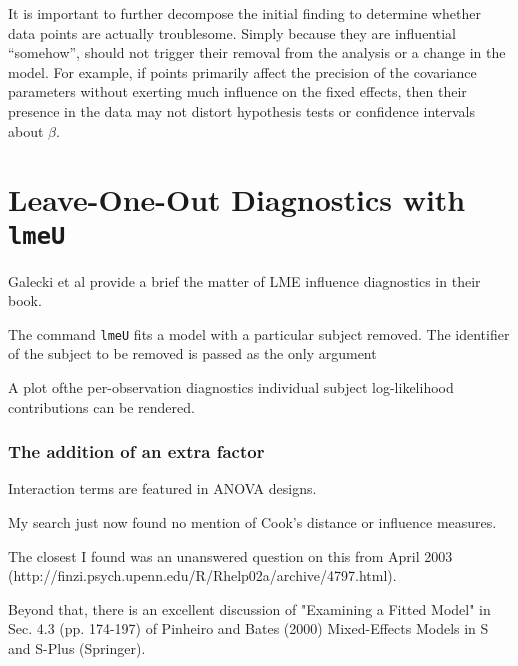 \documentclass[12pt, a4paper]{report}
\theoremstyle{plain}
\theoremstyle{definition}
\theoremstyle{remark}
\begin{document}
It is important to further decompose the initial finding to determine whether data points are actually troublesome.
Simply because they are influential “somehow”, should not trigger their removal from the analysis or
a change in the model. For example, if points primarily affect the precision of the covariance parameters
without exerting much influence on the fixed effects, then their presence in the data may not distort hypothesis
tests or confidence intervals about $\beta$.


\section*{Leave-One-Out Diagnostics with \texttt{lmeU}}
Galecki et al provide a brief the matter of LME influence diagnostics in their book.

The command \texttt{lmeU} fits a model with a particular subject removed. The identifier of the subject to be removed is passed as the only argument

A plot ofthe per-observation diagnostics individual subject log-likelihood contributions can be rendered.

\subsubsection*{The addition of an extra factor}




Interaction terms are featured in ANOVA designs.

My search just now found no mention of Cook's distance or influence measures.  

The closest I found was an unanswered question on this from 
April 2003 (http://finzi.psych.upenn.edu/R/Rhelp02a/archive/4797.html).

Beyond that, there is an excellent discussion of "Examining a Fitted Model" in Sec. 4.3 (pp. 174-197) of Pinheiro and Bates (2000) 
Mixed-Effects Models in S and S-Plus (Springer).  
\end{document}

